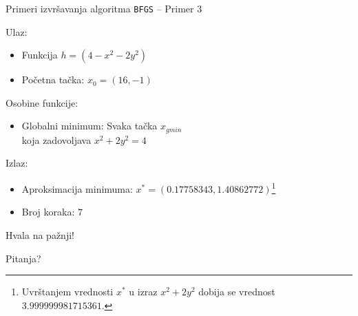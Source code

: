 \documentclass[serbian]{beamer}
\begin{document}
\begin{frame}{Primeri izvr\v savanja algoritma \texttt{BFGS} -- Primer 3}

Ulaz:
\begin{itemize}
	\item Funkcija $h = (4 - x^2 - 2y^2)$
	\item Po\v cetna ta\v cka: $x_0 = (16, -1)$
\end{itemize}

Osobine funkcije:
\begin{itemize}
	\item Globalni minimum: Svaka ta\v cka $x_{gmin}$ \\ 
	koja zadovoljava $x^2 + 2y^2 = 4$
\end{itemize}

Izlaz:
\begin{itemize}
	\item Aproksimacija minimuma: $x^* = (0.17758343, 1.40862772)$\footnote{Uvr\v stanjem vrednosti $x^*$ u izraz $x^2 + 2y^2$ dobija se vrednost $3.999999981715361$.}
	\item Broj koraka: $7$
\end{itemize}

\end{frame}

\begin{frame}

\vspace*{3em}

{\Large Hvala na pa\v znji!} 

\vspace*{1em}

Pitanja?

\end{frame}
\end{document}
